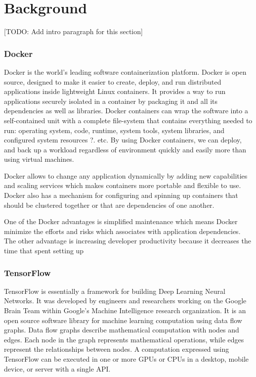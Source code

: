 \documentclass[conference]{IEEEtran}
\begin{document}
\section{Background}
[TODO: Add intro paragraph for this section]\\

\subsubsection{Docker}
Docker is the world's leading software containerization platform. Docker is open source, designed to make it easier to create, deploy, and run distributed applications inside lightweight Linux containers. It provides a way to run applications securely isolated in a container by packaging it and all its dependencies as well as libraries. Docker containers can wrap the software into a self-contained unit with a complete file-system that contains everything needed to run: operating system, code, runtime, system tools, system libraries, and configured system resources ?. etc. By using Docker containers, we can deploy, and back up a workload regardless of environment quickly and easily more than using virtual machines.

Docker allows to change any application dynamically by adding new capabilities and scaling services which makes containers more portable and flexible to use. Docker also has a mechanism for configuring and spinning up containers that should be clustered together or that are dependencies of one another.

One of the Docker advantages is simplified maintenance which means Docker minimize the efforts and risks which associates with application dependencies. The other advantage is increasing developer productivity because it decreases the time that spent setting up 

\subsubsection{TensorFlow}
TensorFlow is essentially a framework for building Deep Learning Neural Networks. It was developed by engineers and researchers working on the Google Brain Team within Google's Machine Intelligence research organization. It is an open source software library for machine learning computation using data flow graphs. Data flow graphs describe mathematical computation with nodes and edges. Each node in the graph represents mathematical operations, while edges represent the relationships between nodes. A computation expressed using TensorFlow can be executed in one or more GPUs or CPUs in a desktop, mobile device, or server with a single API.
\end{document}
